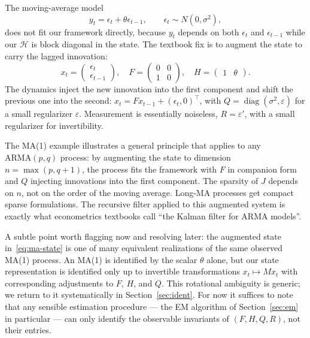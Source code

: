 \documentclass[11pt]{article}
\newcommand{\diag}{\operatorname{diag}}
\begin{document}
The moving-average model
\begin{equation}
y_t=\epsilon_t+\theta\epsilon_{t-1},
\qquad \epsilon_t\sim N(0,\sigma^2),
\end{equation}
does not fit our framework directly, because $y_t$ depends on both
$\epsilon_t$ and $\epsilon_{t-1}$ while our $\mathcal H$ is block
diagonal in the state.  The textbook fix is to augment the state to
carry the lagged innovation:
\begin{equation}
\label{eq:ma-state}
x_t=\begin{pmatrix}\epsilon_t\\ \epsilon_{t-1}\end{pmatrix},
\quad
F=\begin{pmatrix}0 & 0\\ 1 & 0\end{pmatrix},
\quad
H=\begin{pmatrix}1 & \theta\end{pmatrix}.
\end{equation}
The dynamics inject the new innovation into the first component and
shift the previous one into the second:
$x_t=Fx_{t-1}+(\epsilon_t,0)^\top$, with
$Q=\diag(\sigma^2,\varepsilon)$ for a small regularizer
$\varepsilon$.  Measurement is essentially noiseless,
$R=\varepsilon'$, with a small regularizer for invertibility.

The MA(1) example illustrates a general principle that applies to any
$\mathrm{ARMA}(p,q)$ process: by augmenting the state to dimension
$n=\max(p,q+1)$, the process fits the framework with $F$ in companion
form and $Q$ injecting innovations into the first component.  The
sparsity of $J$ depends on $n$, not on the order of the moving
average.  Long-MA processes get compact sparse formulations.  The
recursive filter applied to this augmented system is exactly what
econometrics textbooks call ``the Kalman filter for ARMA models''.

A subtle point worth flagging now and resolving later: the augmented
state in~\eqref{eq:ma-state} is one of many equivalent realizations of
the same observed MA(1) process.  An MA(1) is identified by the scalar
$\theta$ alone, but our state representation is identified only up to
invertible transformations $x_t\mapsto Mx_t$ with corresponding
adjustments to $F$, $H$, and $Q$.  This rotational ambiguity is
generic; we return to it systematically in Section~\ref{sec:ident}.
For now it suffices to note that any sensible estimation procedure ---
the EM algorithm of Section~\ref{sec:em} in particular --- can only
identify the observable invariants of $(F,H,Q,R)$, not their entries.
\end{document}
